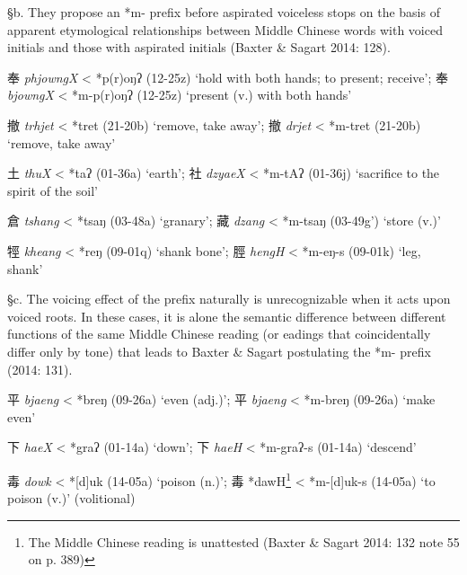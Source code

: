 §b. They propose an *m- prefix before aspirated voiceless stops on the
basis of apparent etymological relationships between Middle Chinese
words with voiced initials and those with aspirated initials (Baxter \&
Sagart 2014: 128).

\begin{description} \item
奉  \emph{phjowngX} \textless{} *p{}(r)oŋʔ (12-25z) `hold with both hands;
to present; receive'; 奉 \emph{bjowngX} \textless{} *m-p{}(r)oŋʔ (12-25z)
`present (v.) with both hands'
\item
撤  \emph{trhjet} \textless{} *t{}ret (21-20b) `remove, take away'; 撤
 \emph{drjet} \textless{} *m-t{}ret (21-20b) `remove, take away'
\item
土  \emph{thuX} \textless{} *t{}{}aʔ (01-36a) `earth'; 社  \emph{dzyaeX}
\textless{} *m-t{}Aʔ (01-36j) `sacrifice to the spirit of the soil'
\item
倉  \emph{tshang} \textless{} *ts{}{}aŋ (03-48a) `granary'; 藏  \emph{dzang}
\textless{} *m-ts{}{}aŋ (03-49g') `store (v.)'
\end{description}

\begin{description} \item
牼  \emph{kheang} \textless{} *{}{}reŋ (09-01q) `shank bone'; 脛
 \emph{hengH} \textless{} *m-{}{}eŋ-s (09-01k) `leg, shank'
\end{description}

§c. The voicing effect of the prefix naturally is unrecognizable when it
acts upon voiced roots. In these cases, it is alone the semantic
difference between different functions of the same Middle Chinese
reading (or eadings that coincidentally differ only by tone) that leads
to Baxter \& Sagart postulating the *m- prefix (2014: 131).

\begin{description} \item
平  \emph{bjaeng} \textless{} *breŋ (09-26a) `even (adj.)'; 平
 \emph{bjaeng} \textless{} *m-breŋ (09-26a) `make even'
\item
下  \emph{haeX} \textless{} *g{}raʔ (01-14a) `down'; 下 \emph{haeH}
\textless{} *m-g{}raʔ-s (01-14a) `descend'
\item
毒  \emph{dowk} \textless{} *[d]{}uk (14-05a) `poison (n.)'; 毒
*dawH\footnote{The Middle Chinese reading is unattested (Baxter \&
  Sagart 2014: 132 note 55 on p. 389)} \textless{} *m-{[}d]{}uk-s
(14-05a) `to poison (v.)' (volitional)
\end{description}


